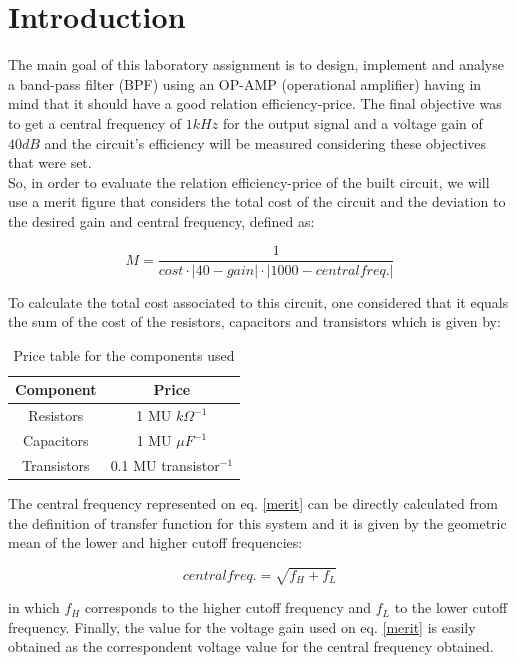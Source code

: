 \section{Introduction}
The main goal of this laboratory assignment is to design, implement and analyse a band-pass filter (BPF) using an OP-AMP (operational amplifier) having in mind that it should have a good relation efficiency-price. The final objective was to get a central frequency of $1kHz$ for the output signal and a voltage gain of $40dB$ and the circuit's efficiency will be measured considering these objectives that were set. \\

So, in order to evaluate the relation efficiency-price of the built circuit, we will use a merit figure that considers the total cost of the circuit and the deviation to the desired gain and central frequency, defined as:

\begin{equation}
    M = \frac{1}{cost \cdot |40 - gain| \cdot |1000 - central freq.|}
    \label{merit}
\end{equation}

To calculate the total cost associated to this circuit, one considered that it equals the sum of the cost of the resistors, capacitors and transistors which is given by:

\begin{table}[H]
    \centering
    \begin{tabular}{c|c}
        \textbf{Component} &  \textbf{Price}\\
        \hline
        Resistors & 1 MU $k\Omega^{-1}$ \\
        Capacitors & 1 MU $\mu F^{-1}$ \\
        Transistors & 0.1 MU transistor$^{-1}$
    \end{tabular}
    \caption{Price table for the components used}
    \label{tab:price}
\end{table}

The central frequency represented on eq. \eqref{merit} can be directly calculated from the definition of transfer function for this system and it is given by the geometric mean of the lower and higher cutoff frequencies:

\begin{equation}
    central freq. = \sqrt{f_H + f_L}
\end{equation}

in which $f_H$ corresponds to the higher cutoff frequency and $f_L$ to the lower cutoff frequency. Finally, the value for the voltage gain used on eq. \eqref{merit} is easily obtained as the correspondent voltage value for the central frequency obtained. \\

